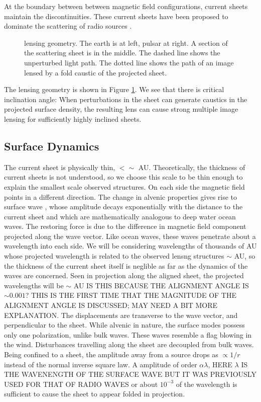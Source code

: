 \documentclass[useAMS,usenatbib]{mn2e}
\begin{document}
At the boundary between between magnetic field configurations, current
sheets maintain the discontinuities.  These current sheets have been
proposed to dominate the scattering of radio
sources \citep{2006ApJ...640L.159G}.

\begin{figure}
\centerline{}
\vspace{-6in}
\caption{lensing geometry.  The earth is at left, pulsar at right.
A section of the scattering sheet is in the middle.  The dashed line 
shows the  unperturbed light path.  The dotted line shows the path of 
an image
lensed by a fold caustic of the projected sheet.}
\label{fig:sheetgeom}
\end{figure}

The lensing geometry is shown in Figure \ref{fig:sheetgeom}.  We see
that there is critical inclination angle: When perturbations in the
sheet can generate caustics in the projected surface density, the
resulting lens can cause strong multiple image lensing for
sufficiently highly inclined sheets.

\subsection{Surface Dynamics}

The current sheet is physically thin, $< \sim $ AU.  Theoretically,
the thickness of current sheets is not understood, so we choose this
scale to be thin enough to explain the smallest scale observed
structures.  On each side the
magnetic field points in a different direction.  The change in alvenic
properties gives rise to surface
wave \citep{1991SoPh..133..263J, 2009GApFD.103...89J}, whose amplitude
decays exponentially with the distance to the current sheet and which are
mathematically analogous to deep water ocean waves.  The restoring force is due to the
difference in magnetic field component projected along the wave
vector.  Like ocean waves, these waves penetrate about a wavelength
into each side.  We will be considering wavelengths of thousands of
AU whose projected wavelength is related to the observed lensng
structures  $\sim$ AU, so the thickness of the current sheet itself is
neglible as far as the dynamics of 
the waves are concerned.  Seen in projection along the aligned sheet,
the projected wavelengths will be $\sim $ AU IS THIS BECAUSE THE ALIGNMENT ANGLE IS
$\sim 0.001$?  THIS IS THE FIRST TIME THAT THE MAGNITUDE OF THE ALIGNMENT ANGLE
IS DISCUSSED; MAY NEED A BIT MORE EXPLANATION.  The displacements are
transverse to the wave vector, and perpendicular to the sheet.  While
alvenic in nature, the surface modes possess only one polarization,
unlike bulk waves.  These waves resemble a flag blowing in the wind.
Disturbances travelling along the sheet are decoupled from bulk waves.
Being confined to a sheet, the amplitude away from a source drops as
$\propto 1/r$ instead of the normal inverse square law.  A amplitude
of order $\alpha \lambda$, HERE $\lambda$ IS THE WAVENENGTH OF THE SURFACE WAVE BUT
IT WAS PREVIOUSLY USED FOR THAT OF RADIO WAVES or about $10^{-3}$ of the wavelength is
sufficient to cause the sheet to appear folded in projection.
\end{document}
